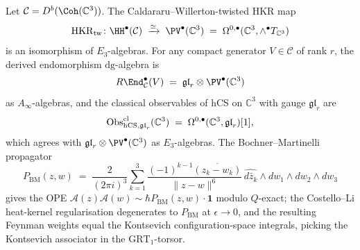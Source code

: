\begin{theorem}
\label{thm:hkr-c3-identifies-treatise}
Let $\mathcal{C} = D^b(\Coh(\mathbb{C}^3))$. The Caldararu--Willerton-twisted HKR map
\[
\mathrm{HKR}_{\mathrm{tw}} \colon \HH^\bullet(\mathcal{C}) \;\xrightarrow{\simeq}\; \PV^\bullet(\mathbb{C}^3) \;=\; \Omega^{0,\bullet}(\mathbb{C}^3, \wedge^\bullet T_{\mathbb{C}^3})
\]
is an isomorphism of $E_3$-algebras. For any compact generator $V \in \mathcal{C}$ of rank $r$, the derived endomorphism $\mathrm{dg}$-algebra is
\[
R\End^\bullet_{\mathcal{C}}(V) \;=\; \mathfrak{gl}_r \otimes \PV^\bullet(\mathbb{C}^3)
\]
as $A_\infty$-algebras, and the classical observables of hCS on $\mathbb{C}^3$ with gauge $\mathfrak{gl}_r$ are
\[
\mathrm{Obs}^{\mathrm{cl}}_{\mathrm{hCS}, \mathfrak{gl}_r}(\mathbb{C}^3) \;=\; \Omega^{0,\bullet}(\mathbb{C}^3, \mathfrak{gl}_r)[1],
\]
which agrees with $\mathfrak{gl}_r \otimes \PV^\bullet(\mathbb{C}^3)$ as $E_3$-algebras. The Bochner--Martinelli propagator
\[
P_{\mathrm{BM}}(z, w) \;=\; \frac{2}{(2\pi i)^3} \sum_{k=1}^{3} \frac{(-1)^{k-1} \overline{(z_k - w_k)}}{\|z - w\|^6} \, \widehat{d\bar z_k} \wedge dw_1 \wedge dw_2 \wedge dw_3
\]
gives the OPE $\mathcal{A}(z) \mathcal{A}(w) \sim \hbar P_{\mathrm{BM}}(z, w) \cdot \mathbf{1}$ modulo $Q$-exact; the Costello--Li heat-kernel regularisation degenerates to $P_{\mathrm{BM}}$ at $\epsilon \to 0$, and the resulting Feynman weights equal the Kontsevich configuration-space integrals, picking the Kontsevich associator in the $\mathrm{GRT}_1$-torsor.
\end{theorem}

